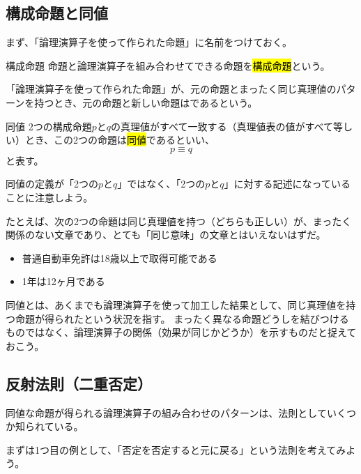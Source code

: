 \documentclass[../../imaging-math]{subfiles}
\begin{document}
\subsection{構成命題と同値}

まず、「論理演算子を使って作られた命題」に名前をつけておく。

\begin{definition}{構成命題}
  命題と論理演算子を組み合わせてできる命題を\hl{構成命題}という。
\end{definition}

「論理演算子を使って作られた命題」が、元の命題とまったく同じ真理値のパターンを持つとき、元の命題と新しい命題はであるという。

\begin{definition}{同値}
  \titlegap
  2つの構成命題$p$と$q$の真理値がすべて一致する（真理値表の値がすべて等しい）とき、この2つの命題は\hl{同値}であるといい、
  \LARGE
  \begin{equation*}
    p \equiv q
  \end{equation*}
  \normalsize
  と表す。
\end{definition}

同値の定義が「2つの$p$と$q$」ではなく、「2つの$p$と$q$」に対する記述になっていることに注意しよう。

\br

たとえば、次の2つの命題は同じ真理値を持つ（どちらも正しい）が、まったく関係のない文章であり、とても「同じ意味」の文章とはいえないはずだ。

\begin{itemize}
  \item 普通自動車免許は18歳以上で取得可能である
  \item 1年は12ヶ月である
\end{itemize}

同値とは、あくまでも論理演算子を使って加工した結果として、同じ真理値を持つ命題が得られたという状況を指す。
まったく異なる命題どうしを結びつけるものではなく、論理演算子の関係（効果が同じかどうか）を示すものだと捉えておこう。

\subsection{反射法則（二重否定）}

同値な命題が得られる論理演算子の組み合わせのパターンは、法則としていくつか知られている。

\br

まずは1つ目の例として、「否定を否定すると元に戻る」という法則を考えてみよう。
\end{document}
